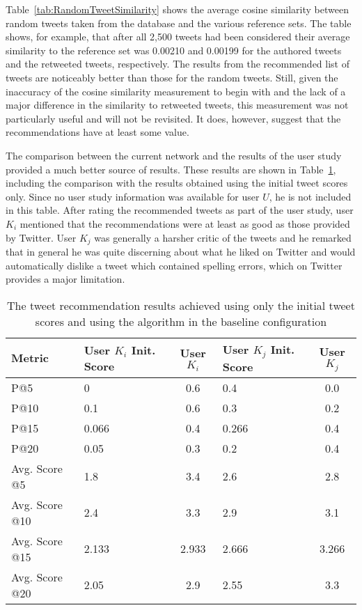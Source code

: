 Table~\ref{tab:RandomTweetSimilarity} shows the average cosine similarity between random tweets taken from the database and the various reference sets. The table shows, for example, that after all 2,500 tweets had been considered their average similarity to the reference set was 0.00210 and 0.00199 for the authored tweets and the retweeted tweets, respectively. The results from the recommended list of tweets are noticeably better than those for the random tweets. Still, given the inaccuracy of the cosine similarity measurement to begin with and the lack of a major difference in the similarity to retweeted tweets, this measurement was not particularly useful and will not be revisited. It does, however, suggest that the recommendations have at least some value.

The comparison between the current network and the results of the user study provided a much better source of results. These results are shown in Table~\ref{tab:BaseTweetResults}, including the comparison with the results obtained using the initial tweet scores only. Since no user study information was available for user $U$, he is not included in this table. After rating the recommended tweets as part of the user study, user $K_{i}$ mentioned that the recommendations were at least as good as those provided by Twitter. User $K_{j}$ was generally a harsher critic of the tweets and he remarked that in general he was quite discerning about what he liked on Twitter and would automatically dislike a tweet which contained spelling errors, which on Twitter provides a major limitation.


\begin{table}
\centering
\begin{tabular}{l|p{2.25cm}|c|p{2.25cm}|c}
{\bf Metric}& {\bf User $K_{i}$ Init. Score} & {\bf User $K_{i}$} & {\bf User $K_{j}$ Init. Score} & {\bf User $K_{j}$} \\ \hline
P@5   & 0 & 0.6 & 0.4 & 0.0 \\ \hline
P@10 & 0.1 & 0.6 & 0.3 & 0.2 \\ \hline
P@15 & 0.066 & 0.4 & 0.266 & 0.4 \\ \hline
P@20 & 0.05 & 0.3 & 0.2 & 0.4 \\ \hline
Avg. Score @5   & 1.8 & 3.4 & 2.6 & 2.8 \\ \hline
Avg. Score @10 & 2.4 & 3.3 & 2.9 & 3.1 \\ \hline
Avg. Score @15 & 2.133 & 2.933 & 2.666 & 3.266 \\ \hline
Avg. Score @20 & 2.05 & 2.9 & 2.55 & 3.3 \\
\end{tabular}
\caption{The tweet recommendation results achieved using only the initial tweet scores and using the algorithm in the baseline configuration}
\label{tab:BaseTweetResults}
\end{table}


